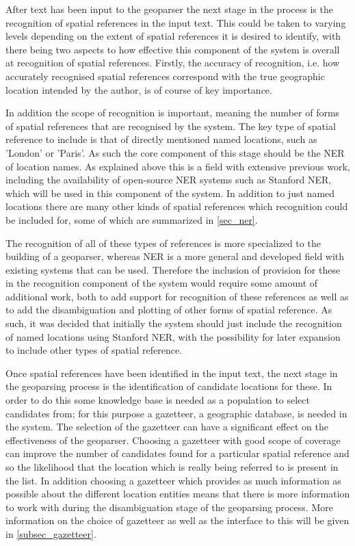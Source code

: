 \documentclass[12pt, a4paper]{report}
\begin{document}
After text has been input to the geoparser the next stage in the process is the recognition of spatial references in the input text. This could be taken to varying levels depending on the extent of spatial references it is desired to identify, with there being two aspects to how effective this component of the system is overall at recognition of spatial references. Firstly, the accuracy of recognition, i.e. how accurately recognised spatial references correspond with the true geographic location intended by the author, is of course of key importance.

In addition the scope of recognition is important, meaning the number of forms of spatial references that are recognised by the system. The key type of spatial reference to include is that of directly mentioned named locations, such as 'London' or 'Paris'. As such the core component of this stage should be the NER of location names. As explained above this is a field with extensive previous work, including the availability of open-source NER systems such as Stanford NER, which will be used in this component of the system. In addition to just named locations there are many other kinds of spatial references which recognition could be included for, some of which are summarized in \ref{sec_ner}.

The recognition of all of these types of references is more specialized to the building of a geoparser, whereas NER is a more general and developed field with existing systems that can be used. Therefore the inclusion of provision for these in the recognition component of the system would require some amount of additional work, both to add support for recognition of these references as well as to add the disambiguation and plotting of other forms of spatial reference. As such, it was decided that initially the system should just include the recognition of named locations using Stanford NER, with the possibility for later expansion to include other types of spatial reference.

Once spatial references have been identified in the input text, the next stage in the geoparsing process is the identification of candidate locations for these. In order to do this some knowledge base is needed as a population to select candidates from; for this purpose a gazetteer, a geographic database, is needed in the system. The selection of the gazetteer can have a significant effect on the effectiveness of the geoparser. Choosing a gazetteer with good scope of coverage can improve the number of candidates found for a particular spatial reference and so the likelihood that the location which is really being referred to is present in the list. In addition choosing a gazetteer which provides as much information as possible about the different location entities means that there is more information to work with during the disambiguation stage of the geoparsing process. More information on the choice of gazetteer as well as the interface to this will be given in \ref{subsec_gazetteer}.
\end{document}
